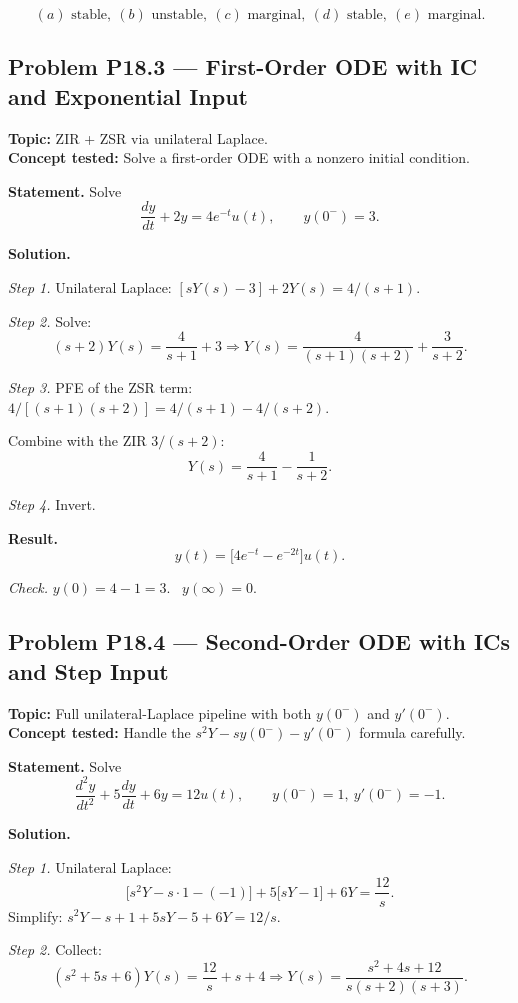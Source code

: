 \documentclass[11pt]{article}
\begin{document}
\[
\boxed{\,(a)\text{ stable},\ (b)\text{ unstable},\ (c)\text{ marginal},\ (d)\text{ stable},\ (e)\text{ marginal.}\,}
\]

\subsection{Problem P18.3 --- First-Order ODE with IC and Exponential Input}
\textbf{Topic:} ZIR + ZSR via unilateral Laplace.\\
\textbf{Concept tested:} Solve a first-order ODE with a nonzero initial condition.

\textbf{Statement.} Solve
\[
\frac{dy}{dt}+2y = 4e^{-t}u(t),\qquad y(0^{-})=3.
\]

\textbf{Solution.}

\textit{Step 1.} Unilateral Laplace:
$[sY(s)-3]+2Y(s) = 4/(s+1)$.

\textit{Step 2.} Solve:
\[
(s+2)Y(s) = \frac{4}{s+1}+3\Rightarrow Y(s) = \frac{4}{(s+1)(s+2)}+\frac{3}{s+2}.
\]

\textit{Step 3.} PFE of the ZSR term:
$4/[(s+1)(s+2)] = 4/(s+1)-4/(s+2)$.

Combine with the ZIR $3/(s+2)$:
\[
Y(s) = \frac{4}{s+1}-\frac{1}{s+2}.
\]

\textit{Step 4.} Invert.

\textbf{Result.}
\[
\boxed{\,y(t) = \bigl[4e^{-t}-e^{-2t}\bigr]u(t).\,}
\]

\textit{Check.} $y(0) = 4-1 = 3$. \checkmark\ $y(\infty) = 0$.

\subsection{Problem P18.4 --- Second-Order ODE with ICs and Step Input}
\textbf{Topic:} Full unilateral-Laplace pipeline with both $y(0^{-})$ and $y'(0^{-})$.\\
\textbf{Concept tested:} Handle the $s^{2}Y-sy(0^{-})-y'(0^{-})$ formula carefully.

\textbf{Statement.} Solve
\[
\frac{d^{2}y}{dt^{2}}+5\frac{dy}{dt}+6y = 12u(t),\qquad y(0^{-})=1,\ y'(0^{-})=-1.
\]

\textbf{Solution.}

\textit{Step 1.} Unilateral Laplace:
\[
\bigl[s^{2}Y - s\cdot 1 - (-1)\bigr] + 5\bigl[sY - 1\bigr] + 6Y = \frac{12}{s}.
\]
Simplify: $s^{2}Y - s + 1 + 5sY - 5 + 6Y = 12/s$.

\textit{Step 2.} Collect:
\[
(s^{2}+5s+6)Y(s) = \frac{12}{s}+s+4\Rightarrow Y(s) = \frac{s^{2}+4s+12}{s(s+2)(s+3)}.
\]
\end{document}
